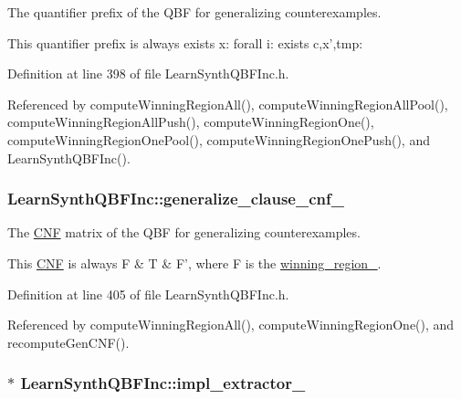 The quantifier prefix of the Q\-B\-F for generalizing counterexamples. 

This quantifier prefix is always exists x\-: forall i\-: exists c,x',tmp\-: 

Definition at line 398 of file Learn\-Synth\-Q\-B\-F\-Inc.\-h.



Referenced by compute\-Winning\-Region\-All(), compute\-Winning\-Region\-All\-Pool(), compute\-Winning\-Region\-All\-Push(), compute\-Winning\-Region\-One(), compute\-Winning\-Region\-One\-Pool(), compute\-Winning\-Region\-One\-Push(), and Learn\-Synth\-Q\-B\-F\-Inc().

\hypertarget{classLearnSynthQBFInc_ad3d20b7d5e6b561c7cf46324962247ba}{
\subsubsection[{generalize\-\_\-clause\-\_\-cnf\-\_\-}]{ Learn\-Synth\-Q\-B\-F\-Inc\-::generalize\-\_\-clause\-\_\-cnf\-\_\-\hspace{0.3cm}{\ttfamily [protected]}}}\label{classLearnSynthQBFInc_ad3d20b7d5e6b561c7cf46324962247ba}


The \hyperlink{classCNF}{C\-N\-F} matrix of the Q\-B\-F for generalizing counterexamples. 

This \hyperlink{classCNF}{C\-N\-F} is always F \& T \& F', where F is the \hyperlink{classLearnSynthQBFInc_abc3503bdb6be7053a7c3d3d7e57858d6}{winning\-\_\-region\-\_\-}. 

Definition at line 405 of file Learn\-Synth\-Q\-B\-F\-Inc.\-h.



Referenced by compute\-Winning\-Region\-All(), compute\-Winning\-Region\-One(), and recompute\-Gen\-C\-N\-F().

\hypertarget{classLearnSynthQBFInc_a7f9f7f6eb87fa49356e728f165e92de7}{
\subsubsection[{impl\-\_\-extractor\-\_\-}]{$\ast$ Learn\-Synth\-Q\-B\-F\-Inc\-::impl\-\_\-extractor\-\_\-\hspace{0.3cm}{\ttfamily [protected]}}}\label{classLearnSynthQBFInc_a7f9f7f6eb87fa49356e728f165e92de7}


